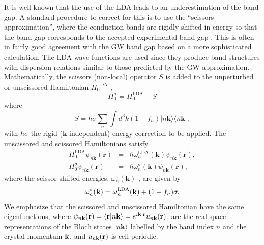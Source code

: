 \documentclass[floatfix,prb,aps,superscriptaddress,11pt,preprint,letterpaper]{revtex4}
\def\chon{red}
\begin{document}
{\color{\chon} It} is well known that the use of the {\color{\chon} LDA} 
leads to an underestimation of the band gap. A standard
procedure to correct for this is to
use {\color{\chon} the} ``scissors approximation'', {\color{\chon} where the 
conduction bands are rigidly shifted in energy} so that the band gap 
corresponds to the accepted experimental band gap{\color{\chon} .
This} is often in fairly good agreement with the GW
band gap based on a more sophisticated calculation.\cite{hybertsenPRB86}
{\color{\chon} T}he LDA wave functions are used since they produce band
structures with dispersion relations similar to those predicted by the GW
approximation. Mathematically, {\color{\chon} the scissors (non-local) operator 
$S$ is added} to the unperturbed or unscissored Hamiltonian {\color{\chon} $H^{\mathrm{LDA}}_{0}$ ,}
\begin{equation*}
H^\sigma_{0}=H^{\mathrm{LDA}}_{0}+S
\end{equation*}
where 
\begin{equation}
S=\hbar \sigma\sum_{n}\int d^{3}k(1-f_{n})
|n\mathbf{k}\rangle\langle n\mathbf{k}|,
\label{hats}
\end{equation}
with $\hbar \sigma$  the rigid ($\mathbf{k}$-independent) energy correction to be
applied. 
The unscissored and scissored Hamiltonians satisfy 
\begin{eqnarray*}
H^{\mathrm{LDA}}_{0}\psi _{n\mathbf{k}}(\mathbf{r}) &=&\hbar \omega^{\mathrm{LDA}}_{n}(\mathbf{k})\psi _{n\mathbf{k}}(\mathbf{r}),
\label{hamils} \\
H_{0}^\sigma\psi _{n\mathbf{k}}(\mathbf{r}) &=&\hbar \omega_{n}^\sigma
(\mathbf{k})\psi _{n\mathbf{k}}(\mathbf{r}),
\end{eqnarray*}
where the scissor-shifted energies, 
$\omega_{n}^\sigma(\mathbf{k})$ , are given by
\begin{equation}
\omega_{n}^\sigma(\mathbf{k})=\omega^{\mathrm{LDA}}_{n}(\mathbf{k})+(1-f_{n})\sigma.
\label{wese}
\end{equation}
We emphasize that the {\color{\chon} scissored and unscissored Hamiltonian 
have the same eigenfunctions,} where
$\psi_{n\mathbf{k}}(\mathbf{r})=\langle {\mathbf{r}} | {n\mathbf{k}} \rangle=e^{i\mathbf{k}\cdot\mathbf{r}}u_{n\mathbf{k}}(\mathbf{r})$,
are the real space representations of the Bloch states $| n\mathbf{k} \rangle$ labelled 
by the band index $n$ and the crystal momentum $\mathbf{k}$, and $u_{n\mathbf{k}}(\mathbf{r})$
is cell periodic. 
\end{document}
